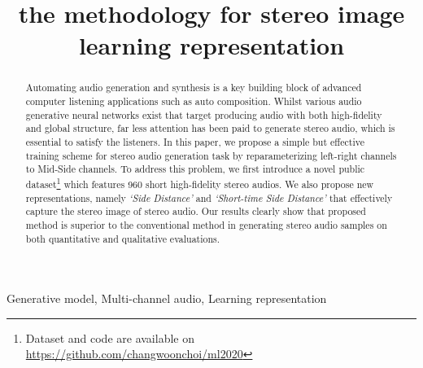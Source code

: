 \documentclass{article}
\title{the methodology for stereo image learning representation}
\begin{document}
\maketitle

\begin{abstract}
Automating audio generation and synthesis is a key building block of advanced computer listening applications such as auto composition. Whilst various audio generative neural networks exist that target producing audio with both high-fidelity and global structure, far less attention has been paid to generate stereo audio, which is essential to satisfy the listeners. In this paper, we propose a simple but effective training scheme for stereo audio generation task by reparameterizing left-right channels to Mid-Side channels. To address this problem, we first introduce a novel public dataset\footnote{Dataset and code are available on \url{https://github.com/changwoonchoi/ml2020}} which features 960 short high-fidelity stereo audios. We also propose new representations, namely \textit{`Side Distance'} and \textit{`Short-time Side Distance'} that effectively capture the stereo image of stereo audio. Our results clearly show that proposed method is superior to the conventional method in generating stereo audio samples on both quantitative and qualitative evaluations.
\end{abstract}

\begin{keywords}
Generative model, Multi-channel audio, Learning representation
\end{keywords}









\end{document}
